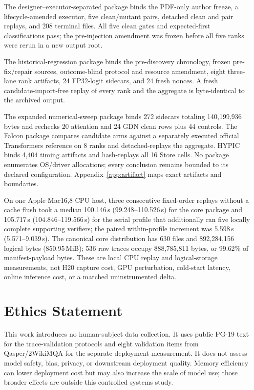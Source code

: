 \documentclass{article}
\begin{document}
The designer--executor-separated package binds the PDF-only author freeze, a
lifecycle-amended executor, five clean/mutant pairs, detached clean and pair
replays, and 208 terminal files.  All five clean gates and expected-first
classifications pass; the pre-injection amendment was frozen before all five
ranks were rerun in a new output root.

The historical-regression package binds the pre-discovery chronology, frozen
pre-fix/repair sources, outcome-blind protocol and resource amendment, eight
three-lane rank artifacts, 24 FP32-logit sidecars, and 24 fresh nonces.  A fresh
candidate-import-free replay of every rank and the aggregate is byte-identical
to the archived output.

The expanded numerical-sweep package binds 272 sidecars totaling 140,199,936
bytes and rechecks 20 attention and 24 GDN clean rows plus 44 controls.  The
Falcon package compares candidate arms against a separately executed official
Transformers reference on 8 ranks and detached-replays the aggregate.  HYPIC
binds 4,404 timing artifacts and hash-replays all 16 Store cells.  No package
enumerates OS/driver allocations; every conclusion remains bounded to its
declared configuration.  Appendix~\ref{app:artifact} maps exact artifacts and
boundaries.

On one Apple Mac16,8 CPU host, three consecutive fixed-order replays without a
cache flush took a median 100.146\,s (99.248--110.526\,s) for the core package
and 105.717\,s (104.846--119.566\,s) for the serial profile that additionally
ran five locally complete supporting verifiers; the paired within-profile
increment was 5.598\,s (5.571--9.039\,s).  The canonical core distribution has
630 files and 892,284,156 logical bytes (850.95\,MiB); 536 raw traces occupy
888,785,811 bytes, or 99.62\% of manifest-payload bytes.  These are local CPU
replay and logical-storage measurements, not H20 capture cost, GPU perturbation,
cold-start latency, online inference cost, or a matched uninstrumented delta.

\section{Ethics Statement}

This work introduces no human-subject data collection.  It uses public PG-19
text for the trace-validation protocols and eight validation items from
Qasper/2WikiMQA for the separate deployment measurement.  It does not assess model
safety, bias, privacy, or downstream deployment quality.  Memory efficiency can
lower deployment cost but may also increase the scale of model use; those
broader effects are outside this controlled systems study.
\end{document}
